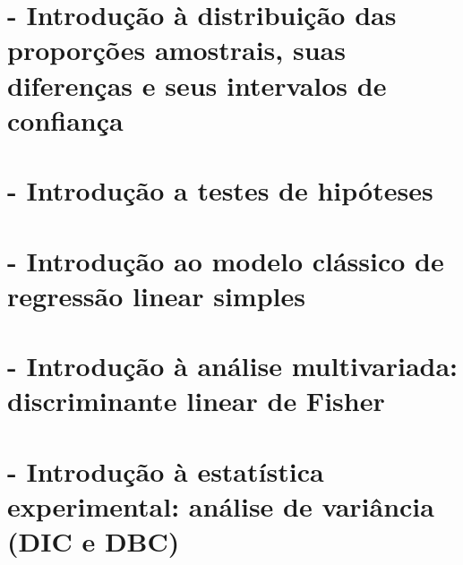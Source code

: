 \documentclass[
]{book}
\begin{document}
\hypertarget{dist_prop_amostrais}{%
\chapter{- Introdução à distribuição das proporções amostrais, suas diferenças e seus intervalos de confiança}\label{dist_prop_amostrais}}

\hypertarget{teste_hipoteses}{%
\chapter{- Introdução a testes de hipóteses}\label{teste_hipoteses}}

\hypertarget{reg_simples}{%
\chapter{- Introdução ao modelo clássico de regressão linear simples}\label{reg_simples}}

\hypertarget{disc_fisher}{%
\chapter{- Introdução à análise multivariada: discriminante linear de Fisher}\label{disc_fisher}}

\hypertarget{anova}{%
\chapter{- Introdução à estatística experimental: análise de variância (DIC e DBC)}\label{anova}}

  
\end{document}
